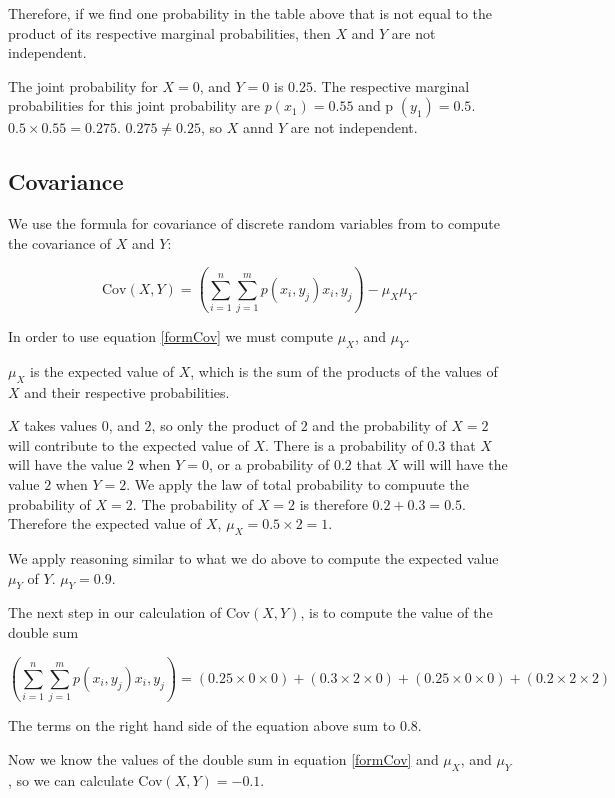 \documentclass[a4paper,11pt]{article}
\begin{document}
Therefore, if we find one probability in the table above that is not
equal to the product of its respective marginal probabilities, then $X$ and
$Y$ are not independent.

The joint probability for $X=0$, and $Y=0$ is $0.25$.  The respective marginal
probabilities for this joint probability are $p\left( x_1 \right)=0.55$ and
p $\left( y_1 \right) = 0.5$.  $0.5 \times 0.55 = 0.275$.  $0.275 \neq 0.25$,
so $X$ annd $Y$ are not independent.

\subsection{Covariance}

We use the formula for covariance of discrete random variables from
\cite{reading7b} to compute the covariance of $X$ and $Y$:

\begin{equation}\label{formCov}
\text{Cov}\left(X, Y \right) =
  \left( \sum_{i=1}^{n} \sum_{j=1}^{m} p\left(x_i, y_j \right) x_i, y_j \right)
      - \mu_{X}\mu_{Y}.
\end{equation}

In order to use equation \ref{formCov} we must compute $\mu_X$, and $\mu_Y$.

$\mu_X$ is the expected value of $X$, which is the sum of the products of
the values of $X$ and their respective probabilities.

$X$ takes values $0$, and $2$, so only the product of $2$ and the probability
of $X=2$ will contribute to the expected value of $X$.  There is a probability
of $0.3$ that $X$ will have the value $2$ when $Y=0$, or a probability of $0.2$
that $X$ will will have the value $2$ when $Y=2$. We apply the law of total
probability to compuute the probability of $X=2$.  The probability of $X=2$ is
therefore $0.2 + 0.3 = 0.5$. Therefore the expected value of $X$,
$\mu_X= 0.5 \times 2 = 1$.

We apply reasoning similar to what we do above to compute the expected value
$\mu_Y$ of $Y$. $\mu_Y=0.9$.

The next step in our calculation of Cov$\left( X, Y \right)$, is to compute
the value of the double sum

\begin{equation}
  \left( \sum_{i=1}^{n} \sum_{j=1}^{m} p\left(x_i, y_j \right) x_i, y_j \right)
  = \left( 0.25 \times 0 \times 0 \right) +
    \left( 0.3 \times 2 \times 0 \right) +
    \left( 0.25 \times 0 \times 0 \right) +
    \left( 0.2 \times 2 \times 2 \right)
\end{equation}

The terms on the right hand side of the equation above sum to $0.8$.

Now we know the values of the double sum in equation \ref{formCov} and $\mu_X$,
and $\mu_Y$, so we can calculate Cov$\left( X, Y \right) = -0.1$.

\printbibliography{}
\end{document}
